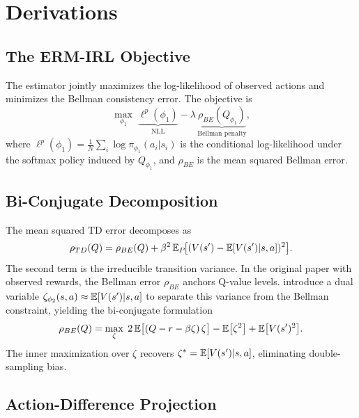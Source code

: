 \documentclass[10pt]{article}
\begin{document}
\section{Derivations}

\subsection{The ERM-IRL Objective}

The estimator jointly maximizes the log-likelihood of observed actions and minimizes the Bellman consistency error. The objective is
\begin{equation}
\label{eq:gladius_obj}
\max_{\phi_1} \; \underbrace{\ell^p(\phi_1)}_{\text{NLL}} - \lambda\,\underbrace{\rho_{BE}(Q_{\phi_1})}_{\text{Bellman penalty}},
\end{equation}
where $\ell^p(\phi_1) = \frac{1}{N}\sum_i \log \pi_{\phi_1}(a_i|s_i)$ is the conditional log-likelihood under the softmax policy induced by $Q_{\phi_1}$, and $\rho_{BE}$ is the mean squared Bellman error.

\subsection{Bi-Conjugate Decomposition}

The mean squared TD error decomposes as
\begin{equation}
\label{eq:biconj}
\rho_{TD}(Q) = \rho_{BE}(Q) + \beta^2\,\mathbb{E}_P\!\bigl[(V(s') - \mathbb{E}[V(s')|s,a])^2\bigr].
\end{equation}
The second term is the irreducible transition variance. In the original paper with observed rewards, the Bellman error $\rho_{BE}$ anchors Q-value levels. \citet{kang2025} introduce a dual variable $\zeta_{\phi_2}(s,a) \approx \mathbb{E}[V(s')|s,a]$ to separate this variance from the Bellman constraint, yielding the bi-conjugate formulation
\begin{equation}
\label{eq:biconj_dual}
\rho_{BE}(Q) = \max_{\zeta}\; 2\,\mathbb{E}\bigl[(Q - r - \beta\zeta)\,\zeta\bigr] - \mathbb{E}\bigl[\zeta^2\bigr] + \mathbb{E}\bigl[V(s')^2\bigr].
\end{equation}
The inner maximization over $\zeta$ recovers $\zeta^* = \mathbb{E}[V(s')|s,a]$, eliminating double-sampling bias.

\subsection{Action-Difference Projection}
\end{document}
